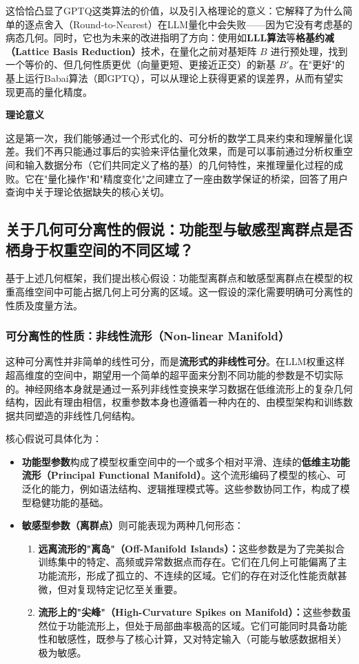 \documentclass[letterpaper,twocolumn,10pt]{article}
\begin{document}
这恰恰凸显了GPTQ这类算法的价值，以及引入格理论的意义：它解释了为什么简单的逐点舍入（Round-to-Nearest）在LLM量化中会失败——因为它没有考虑基的病态几何。同时，它也为未来的改进指明了方向：使用如\textbf{LLL算法}等\textbf{格基约减（Lattice Basis Reduction）}技术，在量化之前对基矩阵 $B$ 进行预处理，找到一个等价的、但几何性质更优（向量更短、更接近正交）的新基 $B'$。在"更好"的基上运行Babai算法（即GPTQ），可以从理论上获得更紧的误差界，从而有望实现更高的量化精度。

\textbf{理论意义}

这是第一次，我们能够通过一个形式化的、可分析的数学工具来约束和理解量化误差。我们不再只能通过事后的实验来评估量化效果，而是可以事前通过分析权重空间和输入数据分布（它们共同定义了格的基）的几何特性，来推理量化过程的成败。它在"量化操作"和"精度变化"之间建立了一座由数学保证的桥梁，回答了用户查询中关于理论依据缺失的核心关切。

\subsection{关于几何可分离性的假说：功能型与敏感型离群点是否栖身于权重空间的不同区域？}

基于上述几何框架，我们提出核心假设：功能型离群点和敏感型离群点在模型的权重高维空间中可能占据几何上可分离的区域。这一假设的深化需要明确可分离性的性质及度量方法。

\subsubsection{可分离性的性质：非线性流形（Non-linear Manifold）}

这种可分离性并非简单的线性可分，而是\textbf{流形式的非线性可分}。在LLM权重这样超高维度的空间中，期望用一个简单的超平面来分割不同功能的参数是不切实际的。神经网络本身就是通过一系列非线性变换来学习数据在低维流形上的复杂几何结构，因此有理由相信，权重参数本身也遵循着一种内在的、由模型架构和训练数据共同塑造的非线性几何结构。

核心假说可具体化为：

\begin{itemize}
\item \textbf{功能型参数}构成了模型权重空间中的一个或多个相对平滑、连续的\textbf{低维主功能流形（Principal Functional Manifold）}。这个流形编码了模型的核心、可泛化的能力，例如语法结构、逻辑推理模式等。这些参数协同工作，构成了模型稳健功能的基础。

\item \textbf{敏感型参数（离群点）}则可能表现为两种几何形态：
\begin{enumerate}
\item \textbf{远离流形的"离岛"（Off-Manifold Islands）：}这些参数是为了完美拟合训练集中的特定、高频或异常数据点而存在。它们在几何上可能偏离了主功能流形，形成了孤立的、不连续的区域。它们的存在对泛化性能贡献甚微，但对复现特定记忆至关重要。

\item \textbf{流形上的"尖峰"（High-Curvature Spikes on Manifold）：}这些参数虽然位于功能流形上，但处于局部曲率极高的区域。它们可能同时具备功能性和敏感性，既参与了核心计算，又对特定输入（可能与敏感数据相关）极为敏感。
\end{enumerate}
\end{itemize}
\end{document}
